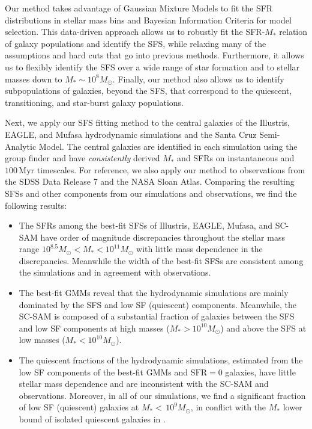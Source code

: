 \documentclass[preprint2,tighten]{aastex62}
\begin{document}
Our method takes advantage of Gaussian Mixture Models to fit the SFR
distributions in stellar mass bins and Bayesian Information Criteria 
for model selection. This data-driven approach allows us to robustly 
fit the SFR-$M_*$ relation of galaxy populations and identify the SFS, 
while relaxing many of the assumptions and hard cuts that go into 
previous methods. Furthermore, it allows us to flexibly identify the 
SFS over  a wide range of star formation and to stellar masses down to 
$M_*{\sim}10^{8}M_\odot$. Finally, our method also allows us to identify 
subpopulations of galaxies, beyond the SFS, that correspond to the 
quiescent, transitioning, and star-burst galaxy populations. 

Next, we apply our SFS fitting method to the central galaxies of the 
Illustris, EAGLE, and {\sc Mufasa} hydrodynamic simulations and the Santa 
Cruz Semi-Analytic Model. The central galaxies are identified in each 
simulation using%
the \cite{tinker2011} group 
finder and have \emph{consistently} derived $M_*$ and SFRs on instantaneous 
and $100\,\mathrm{Myr}$ timescales. For reference, we also apply our 
method to observations from the SDSS Data Release 7 and the NASA Sloan 
Atlas. Comparing the resulting SFSs and other components from our simulations 
and observations, we find the following results:

\begin{itemize}
\item The SFRs among the best-fit SFSs of Illustris, EAGLE, {\sc Mufasa}, 
and SC-SAM have order of magnitude discrepancies throughout the stellar mass 
range $10^{8.5} M_\odot < M_* < 10^{11} M_\odot$ with little mass
dependence in the discrepancies. Meanwhile the width of the best-fit SFSs 
are consistent among the simulations and in agreement with observations.

\item The best-fit GMMs reveal that the hydrodynamic simulations are 
mainly dominated by the SFS and low SF (quiescent) components. Meanwhile,
the SC-SAM is composed of a substantial fraction of galaxies between the 
SFS and low SF components at high masses ($M_* > 10^{10}M_\odot$) and above 
the SFS at low masses ($M_* < 10^{10}M_\odot$).

\item The quiescent fractions of the hydrodynamic simulations, estimated 
from the low SF components of the best-fit GMMs and $\mathrm{SFR}{=}0$ 
galaxies, have little stellar mass dependence and are inconsistent with 
the SC-SAM and observations. Moreover, in all of our simulations, we find 
a significant fraction of low SF (quiescent) galaxies at $M_*{<}\,10^9M_\odot$, 
in conflict with the $M_*$ lower bound of isolated quiescent galaxies in 
\cite{geha2012}.
\end{itemize}
\end{document}
